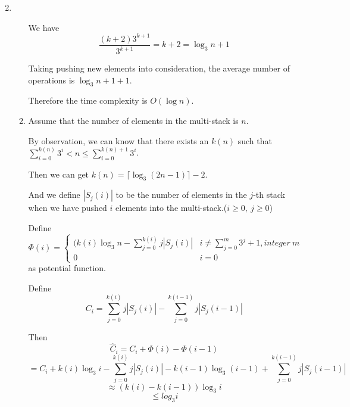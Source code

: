\documentclass[12pt,a4paper]{article}
\makeatletter
\newtheorem*{solution}{Solution}
\theoremstyle{definition}
\renewenvironment{solution}[1][Solution] {\par\pushQED{\qed}\normalfont\topsep6\p@\@plus6\p@\relax\trivlist\item[\hskip\labelsep\bfseries#1\@addpunct{.}]\ignorespaces}{\popQED\endtrivlist\@endpefalse} \makeatother
\makeatother
\begin{document}
\begin{enumerate}
\begin{solution}
\begin{enumerate}
    		    We have
    		    \begin{equation*}
    		        \frac{(k+2)3^{k+1}}{3^{k+1}}=k+2=\log_3 n+1
    		    \end{equation*}
    		    
    		    Taking pushing new elements into consideration, the average number of operations is $\log_3 n+1+1$.
    		    
    		    Therefore the time complexity is $O(\log n)$.
    		    \item 
    		    Assume that the number of elements in the multi-stack is $n$.
    		    
    		    By observation, we can know that there exists an $k(n)$ such that $\sum_{i=0}^{k(n)}3^i<n\le \sum_{i=0}^{k(n)+1}3^i$.
    		    
    		    Then we can get $k(n)=\lceil \log_3(2n-1) \rceil-2$.
    		    
    		    And we define $|S_j(i)|$ to be the number of elements in the $j$-th stack when we have pushed $i$ elements into the multi-stack.($i\ge 0,\ j\ge 0$)
    		    
    		    Define
    		    \begin{equation*}
    		    \Phi(i)=
    		    \begin{cases}
    		    (k(i)\log_3 n -\sum_{j=0}^{k(i)} j|S_j(i)|&i\ne \sum_{j=0}^{m}3^j+1, integer\ m\\
    		    0&i=0
    		    \end{cases}
    		    \end{equation*}
    		    as potential function.
    		    
    		    Define 
    		    \begin{equation*}
    		        C_i=\sum_{j=0}^{k(i)}j|S_j(i)|-\sum_{j=0}^{k(i-1)}j|S_j(i-1)|
    		    \end{equation*}
    		    
    		    Then 
    		    \begin{equation*}
    		        \hat{C}_i=C_i+\Phi(i)-\Phi(i-1)
    		    \end{equation*}
    		    \begin{equation*}
    		    	=C_i+k(i)\log_3 i-\sum_{j=0}^{k(i)}j|S_j(i)|-k(i-1)\log_3(i-1)+\sum_{j=0}^{k(i-1)}j|S_j(i-1)|
    		    \end{equation*}
    		    \begin{equation*}
    		        \approx(k(i)-k(i-1))\log_3 i
    		    \end{equation*}
    		    \begin{equation*}
    		        \le log_3 i
    		    \end{equation*}
    		    

\end{enumerate}
\end{solution}
\end{enumerate}
\end{document}
